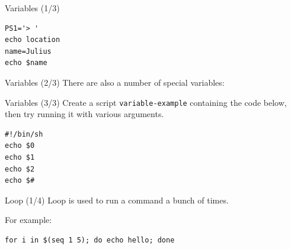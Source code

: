 \documentclass[12pt]{beamer}
\begin{document}
\begin{frame}[fragile]{Variables (1/3)}
  \begin{verbatim}
PS1='> '
echo location
name=Julius
echo $name
\end{verbatim}
\end{frame}

\begin{frame}[fragile]{Variables (2/3)}
  There are also a number of special variables:
\end{frame}

\begin{frame}[fragile]{Variables (3/3)}
  Create a script \texttt{variable-example} containing the code below, then try running it with various arguments.
  \begin{verbatim}
#!/bin/sh
echo $0
echo $1
echo $2
echo $#
\end{verbatim}

\end{frame}

\begin{frame}[fragile]{Loop (1/4)}
  Loop is used to run a command a bunch of times.

  For example:
  \begin{verbatim}
for i in $(seq 1 5); do echo hello; done
\end{verbatim}
\end{frame}
\end{document}
